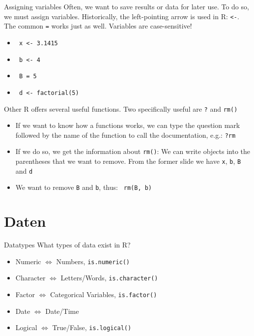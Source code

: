 \documentclass[xcolor=dvipsnames, aspectratio = 169]{beamer}
\begin{document}
\begin{frame}[fragile]{Assigning variables}
Often, we want to save results or data for later use. To do so, we must assign variables. Historically, the left-pointing arrow is used in R: \verb+<-+. The common \verb+=+ works just as well. Variables are case-sensitive!
\begin{itemize}
	\item \verb+ x <- 3.1415+
	\item \verb+ b <- 4+
	\item \verb+ B = 5+
	\item \verb+ d <- factorial(5)+
\end{itemize}
\end{frame}

\begin{frame}[fragile]{Other}
R offers several useful functions. Two specifically useful are \verb+?+ and \verb+rm()+
\begin{itemize}
	\item If we want to know how a functions works, we can type the question mark followed by the name of the function to call the documentation, e.g.: \verb+?rm+
	\item If we do so, we get the information about \verb+rm()+: We can write objects into the parentheses that we want to remove. From the former slide we have \verb+x+, \verb+b+, \verb+B+ and \verb+d+
	\item We want to remove \verb+B+ and \verb+b+, thus: \verb+ rm(B, b)+
\end{itemize}
\end{frame}

\section{Daten}
\begin{frame}[fragile]{Datatypes}
	What types of data exist in R?
	\begin{itemize}
		\item Numeric $\Leftrightarrow$ Numbers, \verb+is.numeric()+
		\item Character $\Leftrightarrow$ Letters/Words, \verb+is.character()+
		\item Factor $\Leftrightarrow$ Categorical Variables, \verb+is.factor()+
		\item Date $\Leftrightarrow$ Date/Time
		\item Logical $\Leftrightarrow$ True/False, \verb+is.logical()+
	\end{itemize}
\end{frame}
\end{document}
